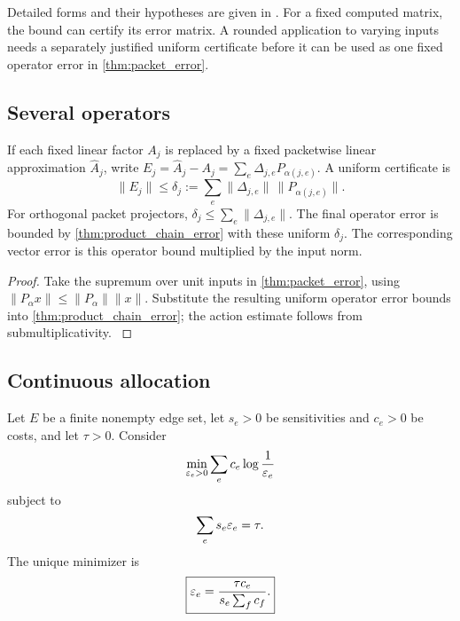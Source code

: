 Detailed forms and their hypotheses are given in \cite{Higham2002,HighamMary2021}. For a fixed computed matrix, the bound can certify its error matrix. A rounded application to varying inputs needs a separately justified uniform certificate before it can be used as one fixed operator error in \cref{thm:packet_error}.

\subsection{Several operators}\label{main:subsection:009}

\begin{corollary}\label{main:corollary:012}\label{cor:mixed_chain}
If each fixed linear factor $A_j$ is replaced by a fixed packetwise linear approximation $\widehat A_j$, write $E_j=\widehat A_j-A_j=\sum_e\Delta_{j,e}P_{\alpha(j,e)}$. A uniform certificate is
\[
\|E_j\|\le\delta_j:=\sum_e\|\Delta_{j,e}\|\,\|P_{\alpha(j,e)}\|.
\]
For orthogonal packet projectors, $\delta_j\le\sum_e\|\Delta_{j,e}\|$. The final operator error is bounded by \cref{thm:product_chain_error} with these uniform $\delta_j$. The corresponding vector error is this operator bound multiplied by the input norm.
\end{corollary}

\begin{proof}\label{main:proof:038}
Take the supremum over unit inputs in \cref{thm:packet_error}, using $\|P_{\alpha}x\|\le\|P_{\alpha}\|\|x\|$. Substitute the resulting uniform operator error bounds into \cref{thm:product_chain_error}; the action estimate follows from submultiplicativity.
\label{main:proof:038:end}\end{proof}

\subsection{Continuous allocation}\label{main:subsection:010}

\begin{theorem}\label{main:theorem:020}\label{thm:continuous_precision}
Let $E$ be a finite nonempty edge set, let $s_e>0$ be sensitivities and $c_e>0$ be costs, and let $\tau>0$. Consider
\[
\min_{\varepsilon_e>0}
\sum_e c_e\log\frac1{\varepsilon_e}
\]
subject to
\[
\sum_es_e\varepsilon_e=\tau.
\]
The unique minimizer is
\[
\boxed{
\varepsilon_e
=
\frac{\tau c_e}{s_e\sum_fc_f}.
}
\]
\end{theorem}

